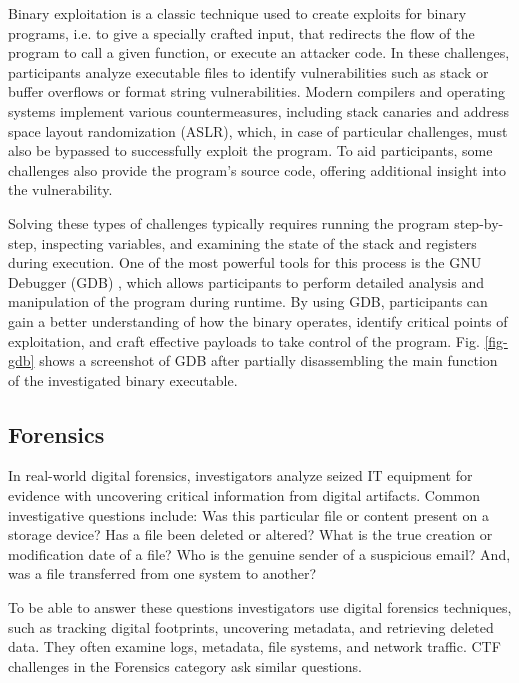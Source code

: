 \documentclass[conference]{IEEEtran}
\begin{document}
Binary exploitation is a classic technique used to create exploits for binary
programs, i.e. to give a specially crafted input, that redirects the flow
of the program to call a given function, or execute an attacker code.
In these challenges, participants analyze executable files to
identify vulnerabilities such as stack or buffer overflows
\cite{lhee2003}
or format string
vulnerabilities.
Modern compilers and operating systems implement various countermeasures,
including stack canaries and address space layout randomization (ASLR), which,
in case of particular challenges,
must also be bypassed to successfully exploit the program. To aid participants, some
challenges also provide the program’s source code, offering additional insight
into the vulnerability.

Solving these types of challenges typically requires running the program
step-by-step, inspecting variables, and examining the state of the stack and
registers during execution. One of the most powerful tools for this process is
the GNU Debugger (GDB)
\cite{stallman1988},
which allows participants to perform detailed analysis and manipulation of
the program during runtime. By using GDB, participants can gain a better
understanding of how the binary operates, identify critical points of
exploitation, and craft effective payloads to take control of the program.
Fig. \ref{fig-gdb} shows a screenshot of GDB after partially disassembling
the main function of the investigated binary executable.

\subsection{Forensics}

In real-world digital forensics, investigators analyze seized IT
equipment for evidence
with uncovering critical information from digital artifacts.
Common investigative questions include: Was this particular file or content
present on a storage device? Has a file been deleted or altered? What is the
true creation or modification date of a file? Who is the genuine sender of a
suspicious email? And, was a file transferred from one system to another?

To be able to answer these questions investigators use digital forensics techniques,
such as tracking digital
footprints, uncovering metadata, and retrieving deleted data. They often
examine logs, metadata, file systems, and network traffic.
CTF challenges in the Forensics category ask similar questions.
\end{document}
